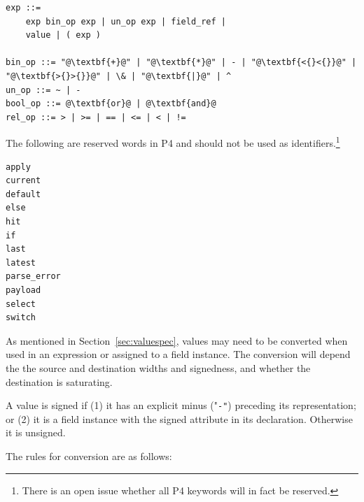 \documentclass[12pt]{article}
\begin{document}
\begin{itemize}
\begin{lstlisting}[frame=single,backgroundcolor=\color{bnfgreen},escapechar=\@]
exp ::=
    exp bin_op exp | un_op exp | field_ref |
    value | ( exp )

bin_op ::= "@\textbf{+}@" | "@\textbf{*}@" | - | "@\textbf{<{}<{}}@" | "@\textbf{>{}>{}}@" | \& | "@\textbf{|}@" | ^
un_op ::= ~ | -
bool_op ::= @\textbf{or}@ | @\textbf{and}@
rel_op ::= > | >= | == | <= | < | !=

\end{lstlisting}


The following are reserved words in P4 and should not be used as identifiers.\footnote{There is an open issue whether all P4 keywords will in fact be reserved.}

\begin{Verbatim}[commandchars=\\\{\}]
apply
current
default
else
hit
if
last
latest
parse_error
payload
select
switch
\end{Verbatim}



As mentioned in Section~\ref{sec:valuespec}, values may need to be 
converted when used in an expression or assigned to a field instance. The 
conversion will depend the the source and destination widths and signedness, 
and whether the destination is saturating. 

A value is signed if (1) it has an explicit minus ("\texttt{-"}) preceding its representation; 
or (2) it is a field instance with the signed attribute in its declaration. 
Otherwise it is unsigned.

The rules for conversion are as follows:


\end{itemize}
\end{document}

